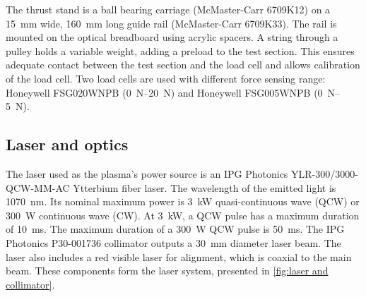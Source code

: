             The thrust stand is a ball bearing carriage (McMaster-Carr 6709K12) on a \qty{15}{mm} wide, \qty{160}{mm} long guide rail (McMaster-Carr 6709K33). The rail is mounted on the optical breadboard using acrylic spacers. A string through a pulley holds a variable weight, adding a preload to the test section. This ensures adequate contact between the test section and the load cell and allows calibration of the load cell. Two load cells are used with different force sensing range: Honeywell FSG020WNPB (\qtyrange{0}{20}{N}) and Honeywell FSG005WNPB (\qtyrange{0}{5}{N}).

        \subsection{Laser and optics}

            The laser used as the plasma's power source is an IPG Photonics YLR-300/3000-QCW-MM-AC Ytterbium fiber laser. The wavelength of the emitted light is \qty{1070}{nm}. Its nominal maximum power is \qty{3}{kW} quasi-continuous wave (QCW) or \qty{300}{W} continuous wave (CW). At \qty{3}{kW}, a QCW pulse has a maximum duration of \qty{10}{ms}. The maximum duration of a \qty{300}{W} QCW pulse is \qty{50}{ms}. The IPG Photonics P30-001736 collimator outputs a \qty{30}{mm} diameter laser beam. The laser also includes a red visible laser for alignment, which is coaxial to the main beam. These components form the laser system, presented in \autoref{fig:laser and collimator}.

